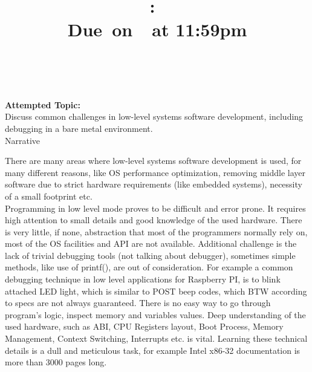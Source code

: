 \documentclass{article}
\title{
    \vspace{2in}
    \textmd{\textbf{\hmwkClass:\ \hmwkTitle}}\\
    \normalsize\vspace{0.1in}\small{Due\ on\ \hmwkDueDate\ at 11:59pm}\\
    \vspace{0.1in}\large{\textit{\hmwkClassInstructor\ \hmwkClassTime}}
    \vspace{3in}
}
\author{\textbf{\hmwkAuthorName}}
\date{}
\begin{document}
\maketitle

\pagebreak

\textbf{Attempted Topic: }\\
Discuss common challenges in low-level systems software development, including debugging in
a bare metal environment.\\

Narrative
\vspace{0.5cm}


There are many areas where low-level systems software development is used, for many
different reasons, like OS performance optimization, removing middle layer software due to strict
hardware requirements (like embedded systems), necessity of a small footprint etc. \\

\indent
Programming in low level mode proves to be difficult and error prone. It requires high
attention to small details and good knowledge of the used hardware. There is very little, if 
none,
abstraction that most of the programmers normally rely on, most of the OS facilities and API 
are not
available. Additional challenge is the lack of trivial debugging tools (not talking about
debugger), sometimes simple methods, like use of printf(), are out of consideration. 
For example a
common debugging technique in low level applications for Raspberry PI, is to blink attached
LED light, which is similar to POST beep codes, which BTW according to specs are not always
guaranteed.  There is no easy way to go through program's logic, inspect memory and variables 
values.
Deep understanding of the used hardware, such as ABI, CPU
Registers layout, Boot Process, Memory Management, Context Switching, Interrupts etc. is 
vital.  
Learning these technical details is a dull and meticulous task, for example Intel x86-32 
documentation is more than 3000 pages long.
\\
\end{document}

